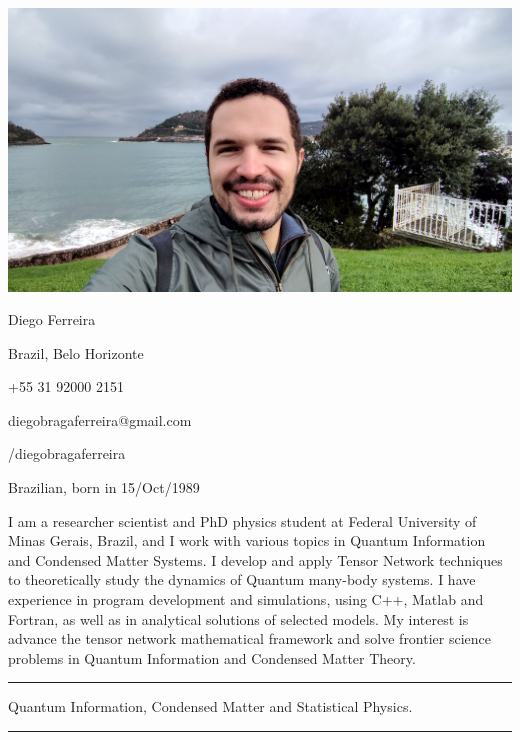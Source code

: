 \documentclass[a4paper,10pt]{article}
\newlength{\cvcolumngapwidth}
\newlength{\cvleftcolumnwidth}
\newlength{\cvrightcolumnwidth}
\newcommand{\cvnamestyle}[1]{{\Large\cvnamefont\textcolor{cvnamecolor}{#1}}}
\newcommand{\cvsectionstyle}[1]{{\normalsize\cvsectionfont\textcolor{cvsectioncolor}{#1}}}
\newcommand{\cvtitlestyle}[1]{{\normalsize\cvtitlefont\textcolor{cvtitlecolor}{#1}}}
\newcommand{\cvdurationstyle}[1]{{\normalsize\cvdurationfont\textcolor{cvdurationcolor}{#1}}}
\newlength{\cvafteritemskipamount}
\newlength{\cvaftersectionskipamount}
\newlength{\cvafternameskipamount}
\newlength{\cvafterpersonalinfolineskipamount}
\newlength{\cvaftertitleskipamount}
\newlength{\cvparskip}
\newcommand{\cvpersonalinfo}[2]{
    \begin{minipage}[t]{\cvleftcolumnwidth}
        \vspace{0mm} %
        \raggedleft #1
    \end{minipage}%
    \hspace{\cvcolumngapwidth}%
    \begin{minipage}[t]{\cvrightcolumnwidth}
        \vspace{0mm} %
        #2
    \end{minipage}
    \vspace{\cvafteritemskipamount}}
\newcommand{\cvname}[1]{
    \cvnamestyle{#1}
    \vspace{\cvafternameskipamount}}
\newcommand{\cvpersonalinfolinewithicon}[3]{
    \raisebox{.5\fontcharht\font`E-.5\height}{\texttt{[image: \#2]}}
    #3
    \vspace{\cvafterpersonalinfolineskipamount}}
\newcommand{\cvsection}[1]{
    \begin{minipage}[t]{\cvleftcolumnwidth}
        \raggedleft\cvsectionstyle{#1}
    \end{minipage}%
    \hspace{\cvcolumngapwidth}%
    \begin{minipage}[t]{\cvrightcolumnwidth}
        \textcolor{cvrulecolor}{\rule{\cvrightcolumnwidth}{0.5mm}}
    \end{minipage}
    \vspace{\cvaftersectionskipamount}}
\newcommand{\cvitem}[2]{
    \begin{minipage}[t]{\cvleftcolumnwidth}
        \raggedleft #1
    \end{minipage}%
    \hspace{\cvcolumngapwidth}%
    \begin{minipage}[t]{\cvrightcolumnwidth}
        \setlength{\parskip}{\cvparskip} #2
    \end{minipage}
    \vspace{\cvafteritemskipamount}}
\newcommand{\cvtitle}[1]{
    \cvtitlestyle{#1}
    \vspace{\cvaftertitleskipamount}
    \vspace{-\cvparskip}}
\begin{document}
\cvpersonalinfo{\includegraphics[trim=1000 200 1100 200,clip,scale=0.08]{diego.jpg}} %
    {\cvname{Diego Ferreira}
    
    \cvpersonalinfolinewithicon{height=4.5mm}{globe.png}{Brazil, Belo Horizonte} %
    
    \cvpersonalinfolinewithicon{height=4.5mm}{phone.png}{+55 31 92000 2151} %
    
    \cvpersonalinfolinewithicon{height=4.5mm}{envelope.png}{diegobragaferreira@gmail.com} %
    
    \cvpersonalinfolinewithicon{height=4.5mm}{github.png}{/diegobragaferreira}
    
    \cvpersonalinfolinewithicon{height=4.5mm}{passport.png}{Brazilian, born in 15/Oct/1989}
    
    \cvpersonalinfolinewithicon{height=4.5mm}{comment.png}{
    I am a researcher scientist and PhD physics student at Federal University of Minas Gerais, Brazil, 
    and I work with various topics in Quantum Information and Condensed Matter Systems.
    I develop and apply Tensor Network techniques to theoretically 
    study the dynamics of Quantum many-body systems.
    I have experience in program development and simulations, using 
    C++, Matlab and Fortran, as well as in analytical solutions of selected models.
    My interest is advance the tensor network mathematical framework and solve 
    frontier science problems in Quantum Information and Condensed Matter Theory.}}

    
\cvsection{Area of research}

\cvitem{\cvdurationstyle{}}
    {\cvtitle{}
    Quantum Information, Condensed Matter and Statistical Physics.
    }    

\cvsection{Topics of Interest}
\end{document}
